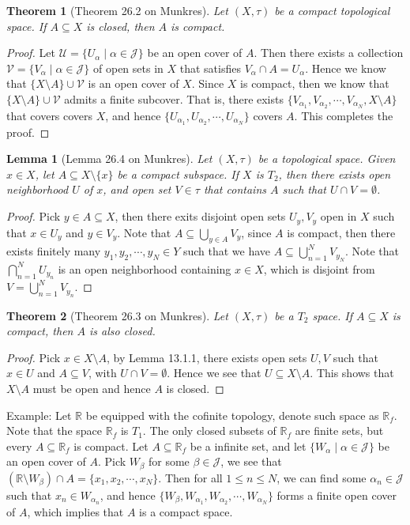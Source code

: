 \documentclass[11pt]{book}
\theoremstyle{break}
\theoremstyle{break}
\newtheorem{thm}{Theorem}[section]
\newtheorem{lem}{Lemma}[thm]
\newcommand{\R}{\mathbb{R}}
\newcommand{\example}{\color{green}Example: \color{black}}
\begin{document}
\begin{thm}[Theorem 26.2 on Munkres]
Let $(X,\tau)$ be a compact topological space. If $A\subseteq X$ is closed, then $A$ is compact. 
\end{thm}
\begin{proof}
Let $\mathcal{U} =\{U_\alpha \mid \alpha \in \mathcal{J}\}$ be an open cover of $A$. Then there exists a collection $\mathcal{V} =\{V_\alpha \mid \alpha \in \mathcal{J}\}$ of open sets in $X$ that satisfies $V_\alpha \cap A = U_\alpha$. Hence we know that $\{X\setminus A\}\cup\mathcal{V}$ is an open cover of $X$. Since $X$ is compact, then we know that $\{X\setminus A\}\cup\mathcal{V}$ admits a finite subcover. That is, there exists $\{V_{\alpha_1}, V_{\alpha_2},\cdots, V_{\alpha_N}, X\setminus A\} $ that covers covers $X$, and hence $\{U_{\alpha_1}, U_{\alpha_2},\cdots, U_{\alpha_N} \}$ covers $A$. This completes the proof.
 \end{proof}

\begin{lem}[Lemma 26.4 on Munkres]
Let $(X,\tau)$ be a topological space. Given $x \in X$, let $A\subseteq X\setminus \{x\}$ be a compact subspace. If $X$ is $T_2$, then there exists open neighborhood $U$ of $x$, and open set $V \in \tau$ that contains $A$  such that $U\cap V = \emptyset$. 
\end{lem}
\begin{proof}
Pick $y \in A\subseteq X$, then there exits disjoint open sets $U_y, V_y$ open in $X$ such that $x \in U_y$ and $y \in V_y$. Note that $A \subseteq \bigcup_{y \in A}V_y$, since $A$ is compact, then there exists finitely many $y_1,y_2,\cdots, y_N \in Y$ such that we have $A \subseteq \bigcup_{n=1}^N V_{y_N}$. Note that $\bigcap_{n=1}^N U_{y_n}$ is an open neighborhood containing $x \in X$, which is disjoint from $V = \bigcup_{n=1}^N V_{y_n}$.
\end{proof}

\begin{thm}[Theorem 26.3 on Munkres]
Let $(X,\tau)$ be a $T_2$ space. If $A\subseteq X$ is compact, then $A$ is also closed.
\end{thm}
\begin{proof}
Pick $x \in X\setminus A$, by Lemma 13.1.1, there exists open sets $U,V$ such that $x \in U$ and $A\subseteq V$, with $U\cap V =\emptyset$. Hence we see that $U \subseteq X\setminus A$. This shows that $X\setminus A$ must be open and hence $A$ is closed.
\end{proof}


\example Let $\R$ be equipped with the cofinite topology, denote such space as $\R_f$. Note that the space $\R_f$ is $T_1$. The only closed subsets of $\R_f$ are finite sets, but every $A\subseteq \R_f$ is compact. Let $A\subseteq \R_f$ be a infinite set, and let $\{W_\alpha \mid \alpha \in \mathcal{J}\}$ be an open cover of $A$. Pick $W_\beta$ for some $\beta \in \mathcal{J}$, we see that $(\R\setminus W_\beta) \cap A = \{x_1,x_2,\cdots, x_N\}$. Then for all $1\leq n \leq N$, we can find some $\alpha_n\in \mathcal{J}$ such that $x_n \in W_{\alpha_n}$, and hence $\{W_\beta, W_{\alpha_1},W_{\alpha_2},\cdots, W_{\alpha_N}\}$ forms a finite open cover of $A$, which implies that $A$ is a compact space. \\
\end{document}
